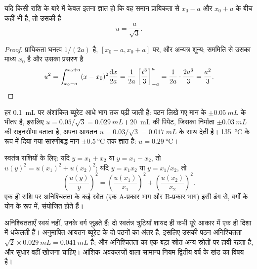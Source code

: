 \begin{proposition}[आयताकार बंटन के लिए B-प्रकार मूल्यांकन]\label{prop:b1:lab-techniques-1:type-b}
यदि किसी राशि के बारे में केवल इतना ज्ञात हो कि वह समान
प्रायिकता से $x_0 - a$ और $x_0 + a$ के बीच कहीं भी है, तो उसकी  है
\[
  u = \frac{a}{\sqrt3}.
\]
\end{proposition}
\begin{proof}
प्रायिकता घनत्व $1/(2a)$ है, $[x_0 - a, x_0 + a]$ पर, और अन्यत्र
शून्य; सममिति से उसका माध्य $x_0$ है और उसका प्रसरण है
\[
  u^2 = \int_{x_0-a}^{x_0+a} (x - x_0)^2 \frac{\mathrm{d}x}{2a}
      = \frac{1}{2a} \left[\frac{t^3}{3}\right]_{-a}^{a}
      = \frac{1}{2a}\cdot\frac{2a^3}{3} = \frac{a^2}{3}. \qedhere
\]
\end{proof}

\begin{example}
हर \qty{0.1}{mL} पर अंशांकित ब्यूरेट आधे भाग तक पढ़ी जाती है:
पठन लिखे गए मान के $\pm\qty{0.05}{mL}$ के भीतर है, इसलिए
$u = 0.05/\sqrt3 = \qty{0.029}{mL}$। \qty{20}{mL} की पिपेट, जिसका निर्माता
$\pm\qty{0.03}{mL}$ की सहनसीमा बताता है, अपना आयतन
$u = 0.03/\sqrt3 = \qty{0.017}{mL}$ के साथ देती है। \qty{135}{\celsius} के रूप में दिया गया
सारणीबद्ध मान $\pm\qty{0.5}{\celsius}$ तक ज्ञात है: $u = \qty{0.29}{\celsius}$।
\end{example}

\begin{proposition}[अनिश्चितताओं का संयोजन]\label{prop:b1:lab-techniques-1:combine}
स्वतंत्र राशियों के लिए: यदि $y = x_1 + x_2$ या $y = x_1 - x_2$, तो
$u(y)^2 = u(x_1)^2 + u(x_2)^2$; यदि $y = x_1 x_2$ या $y = x_1/x_2$, तो
\[
  \left(\frac{u(y)}{y}\right)^2 = \left(\frac{u(x_1)}{x_1}\right)^2
  + \left(\frac{u(x_2)}{x_2}\right)^2 .
\]
एक ही राशि पर अनिश्चितता के कई स्रोत (एक A-प्रकार भाग और
B-प्रकार भाग) इसी ढंग से, वर्गों के योग के रूप में, संयोजित होते हैं।
\end{proposition}
\admitted

अनिश्चितताएँ स्वयं नहीं, उनके वर्ग जुड़ते हैं: दो स्वतंत्र
त्रुटियाँ शायद ही कभी पूरे आकार में एक ही दिशा में धकेलती हैं। अनुमापित आयतन
ब्यूरेट के दो पठनों का अंतर है, इसलिए उसकी पठन अनिश्चितता
$\sqrt2 \times \qty{0.029}{mL} = \qty{0.041}{mL}$ है; और अनिश्चितता का एक बड़ा स्रोत
अन्य स्रोतों पर हावी रहता है, और सुधार वहीं खोजना
चाहिए। आंशिक अवकलजों वाला सामान्य नियम
द्वितीय वर्ष के खंड का विषय है।

